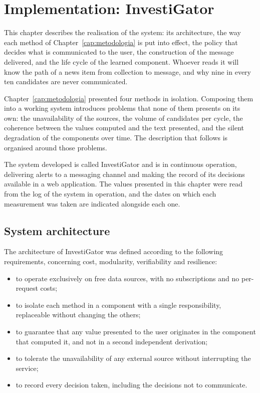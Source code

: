 \chapter{Implementation: InvestiGator}
\label{cap:sistema}

This chapter describes the realisation of the system: its architecture, the way each method of
Chapter~\ref{cap:metodologia} is put into effect, the policy that decides what is communicated to
the user, the construction of the message delivered, and the life cycle of the learned
component. Whoever reads it will know the path of a news item from collection to message, and why nine in every ten candidates are never communicated.

Chapter~\ref{cap:metodologia} presented four methods in isolation. Composing them into a working
system introduces problems that none of them presents on its own: the unavailability of the
sources, the volume of candidates per cycle, the coherence between the values computed and the text
presented, and the silent degradation of the components over time. The description that follows is
organised around those problems.

The system developed is called InvestiGator and is in continuous operation, delivering alerts to a
messaging channel and making the record of its decisions available in a web application. The values
presented in this chapter were read from the log of the system in operation, and the dates on which
each measurement was taken are indicated alongside each one.

\section{System architecture}
\label{sec:sis_arquitetura}

The architecture of InvestiGator was defined according to the following requirements, concerning
cost, modularity, verifiability and resilience:

\begin{itemize}
  \item to operate exclusively on free data sources, with no subscriptions and no per-request
        costs;
  \item to isolate each method in a component with a single responsibility, replaceable without
        changing the others;
  \item to guarantee that any value presented to the user originates in the component that
        computed it, and not in a second independent derivation;
  \item to tolerate the unavailability of any external source without interrupting the service;
  \item to record every decision taken, including the decisions not to communicate.
\end{itemize}

